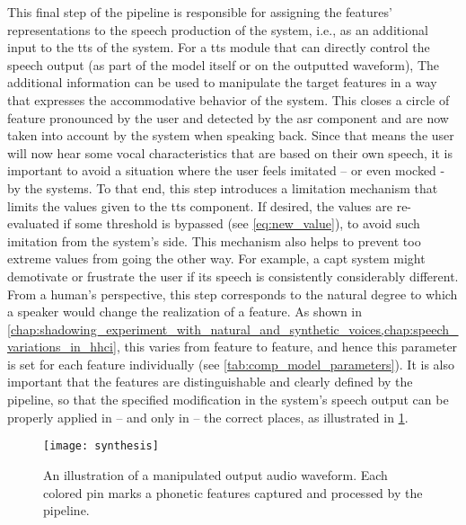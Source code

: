 This final step of the pipeline is responsible for assigning the features' representations to the speech production of the system, i.e., as an additional input to the \ac{tts} of the system.
For a \ac{tts} module that can directly control the speech output (as part of the model itself or on the outputted waveform),
The additional information can be used to manipulate the target features in a way that expresses the accommodative behavior of the system.
This closes a circle of feature pronounced by the user and detected by the \ac{asr} component and are now taken into account by the system when speaking back.
Since that means the user will now hear some vocal characteristics that are based on their own speech, it is important to avoid a situation where the user feels imitated -- or even mocked - by the systems.
To that end, this step introduces a limitation mechanism that limits the values given to the \ac{tts} component.
If desired, the values are re-evaluated if some threshold is bypassed (see \cref{eq:new_value}), to avoid such imitation from the system's side.
This mechanism also helps to prevent too extreme values from going the other way.
For example, a \ac{capt} system might demotivate or frustrate the user if its speech is consistently considerably different.
From a human's perspective, this step corresponds to the natural degree to which a speaker would change the realization of a feature.
As shown in \cref{chap:shadowing_experiment_with_natural_and_synthetic_voices,chap:speech_variations_in_hhci}, this varies from feature to feature, and hence this parameter is set for each feature individually (see \cref{tab:comp_model_parameters}).
It is also important that the features are distinguishable and clearly defined by the pipeline, so that the specified modification in the system's speech output can be properly applied in -- and only in -- the correct places, as illustrated in \cref{fig:adapted_synthesis_output}.
%
\begin{figure}
	\centering
	\texttt{[image: synthesis]}
	\caption[Manipulated features on a synthesized waveform (illustration)]
		{An illustration of a manipulated output audio waveform.
		Each colored pin marks a phonetic features captured and processed by the pipeline.}
	\label{fig:adapted_synthesis_output}
\end{figure}


